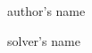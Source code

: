 \documentclass{qmolist}
\begin{document}
\soltrue
\begin{problem}{author's name}
\end{problem}
\begin{solution*}{solver's name}
\end{solution*}
\begin{remark}
\end{remark}
\end{document}
